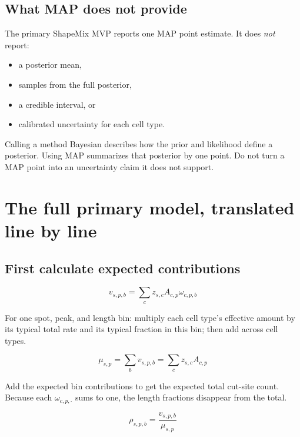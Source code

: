 \documentclass[11pt]{article}
\begin{document}
\subsection{What MAP does not provide}

The primary ShapeMix MVP reports one MAP point estimate. It does \emph{not} report:

\begin{itemize}[leftmargin=2em]
  \item a posterior mean,
  \item samples from the full posterior,
  \item a credible interval, or
  \item calibrated uncertainty for each cell type.
\end{itemize}

\begin{watchout}
Calling a method Bayesian describes how the prior and likelihood define a
posterior. Using MAP summarizes that posterior by one point. Do not turn a MAP
point into an uncertainty claim it does not support.
\end{watchout}

\section{The full primary model, translated line by line}

\subsection{First calculate expected contributions}

\[
\boxed{
v_{s,p,b}=\sum_cz_{s,c}A_{c,p}\omega_{c,p,b}
}
\]

\begin{translation}
For one spot, peak, and length bin: multiply each cell type's effective amount by
its typical total rate and its typical fraction in this bin; then add across cell
types.
\end{translation}

\[
\boxed{
\mu_{s,p}=\sum_bv_{s,p,b}=\sum_cz_{s,c}A_{c,p}
}
\]

\begin{translation}
Add the expected bin contributions to get the expected total cut-site count.
Because each \(\omega_{c,p,\boldsymbol{\cdot}}\) sums to one, the length fractions
disappear from the total.
\end{translation}

\[
\boxed{
\rho_{s,p,b}=\frac{v_{s,p,b}}{\mu_{s,p}}
}
\]
\end{document}
